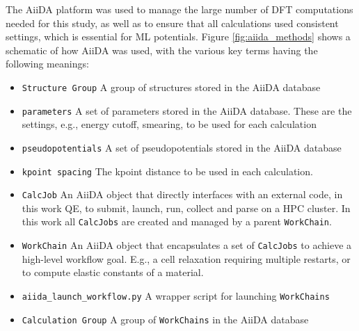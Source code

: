 \documentclass{article}
\begin{document}
The AiiDA platform \cite{Pizzi2016, Huber2020AiiDAProvenance} was used to manage the large number of DFT computations needed for this study, as well as to ensure that all calculations used consistent settings, which is essential for ML potentials\cite{Dragoni2018AchievingIron}.
Figure \ref{fig:aiida_methods} shows a schematic of how AiiDA was used, with the various key terms having the following meanings:
\begin{itemize}
    \item \texttt{Structure Group}  A group of structures stored in the AiiDA database
    \item \texttt{parameters}  A set of parameters stored in the AiiDA database. These are the settings, e.g., energy cutoff, smearing, to be used for each calculation
    \item \texttt{pseudopotentials}  A set of pseudopotentials stored in the AiiDA database 
    \item \texttt{kpoint spacing}  The kpoint distance to be used in each calculation. 
    \item \texttt{CalcJob}    An AiiDA object that directly interfaces with an external code, 
                                          in this work QE, to submit, launch, run, collect and parse on a HPC 
                                          cluster. In this work all \texttt{CalcJobs} are created and
                                          managed by a parent \texttt{WorkChain}.
    \item \texttt{WorkChain}  An AiiDA object that encapsulates a set of \texttt{CalcJobs} to 
                                          achieve a high-level workflow goal. E.g., a cell relaxation requiring 
                                          multiple restarts, or to compute elastic constants of a material. 
    \item \texttt{aiida_launch_workflow.py}  A wrapper script for launching \texttt{WorkChains} 
    \item \texttt{Calculation Group}  A group of \texttt{WorkChains} in the AiiDA database 
\end{itemize}
\end{document}
